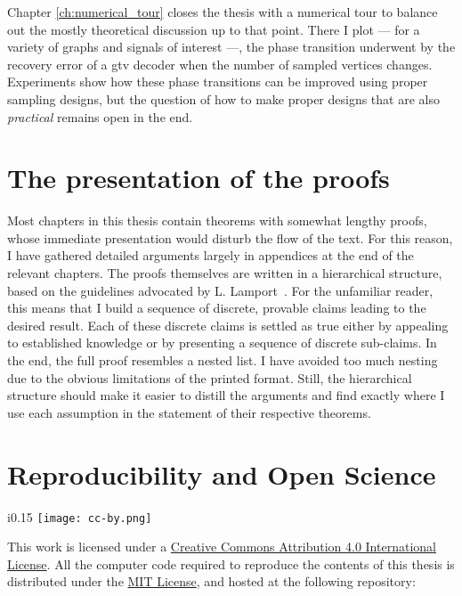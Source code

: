 Chapter \ref{ch:numerical_tour} closes the thesis with a numerical tour to balance out the mostly theoretical discussion up to that point. There I plot --- for a variety of graphs and signals of interest ---, the phase transition underwent by the recovery error of a \acrshort{gtv} decoder when the number of sampled vertices changes. Experiments show how these phase transitions can be improved using proper sampling designs, but the question of how to make proper designs that are also \emph{practical} remains open in the end.

\section{The presentation of the proofs}

Most chapters in this thesis contain theorems with somewhat lengthy proofs, whose immediate presentation would disturb the flow of the text. For this reason, I have gathered detailed arguments largely in appendices at the end of the relevant chapters. The proofs themselves are written in a hierarchical structure, based on the guidelines advocated by L. Lamport~\cite{lamport2012}. For the unfamiliar reader, this means that I build a sequence of discrete, provable claims leading to the desired result. Each of these discrete claims is settled as true either by appealing to established knowledge or by presenting a sequence of discrete sub-claims. In the end, the full proof resembles a nested list. I have avoided too much nesting due to the obvious limitations of the printed format. Still, the hierarchical structure should make it easier to distill the arguments and find exactly where I use each assumption in the statement of their respective theorems.

\section{Reproducibility and Open Science}

\begin{minipage}{\textwidth}
    {%
    \setlength\intextsep{0pt}
        \begin{wrapfigure}{i}{0.15\textwidth}
            \texttt{[image: cc-by.png]}
        \end{wrapfigure}
    \noindent This work is licensed under a \href{http://creativecommons.org/licenses/by/4.0/}{Creative Commons Attribution 4.0 International License}. All the computer code required to reproduce the contents of this thesis is distributed under the \href{https://opensource.org/licenses/MIT}{MIT License}, and hosted at the following repository:
    \begin{center}
    \end{center}%
    }
\end{minipage}
